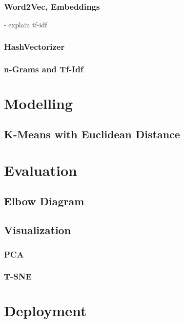 		\subsubsection{Word2Vec, Embeddings}
		- explain tf-idf
		\subsubsection{HashVectorizer}
		\subsubsection{n-Grams and Tf-Idf}

\section{Modelling}
	\subsection{K-Means with Euclidean Distance}
\section{Evaluation}
	\subsection{Elbow Diagram}
	\subsection{Visualization}
		\subsubsection{PCA}
		\subsubsection{T-SNE}
\section{Deployment}
